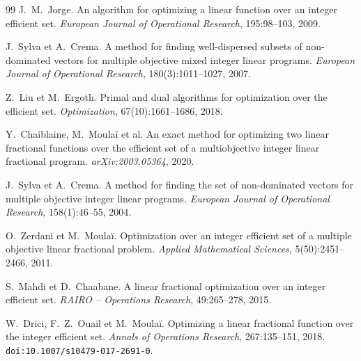 \documentclass[11pt,a4paper]{article}
\theoremstyle{plain}
\theoremstyle{remark}
\begin{document}
\begin{thebibliography}{99}
J.~M.~Jorge.
\newblock An algorithm for optimizing a linear function over an integer
  efficient set.
\newblock \emph{European Journal of Operational Research}, 195:98--103, 2009.

J.~Sylva et A.~Crema.
\newblock A method for finding well-dispersed subsets of non-dominated vectors
  for multiple objective mixed integer linear programs.
\newblock \emph{European Journal of Operational Research},
  180(3):1011--1027, 2007.

Z.~Liu et M.~Ergoth.
\newblock Primal and dual algorithms for optimization over the efficient set.
\newblock \emph{Optimization}, 67(10):1661--1686, 2018.

Y.~Chaiblaine, M.~Moulaï et al.
\newblock An exact method for optimizing two linear fractional functions over
  the efficient set of a multiobjective integer linear fractional program.
\newblock \emph{arXiv:2003.05364}, 2020.

J.~Sylva et A.~Crema.
\newblock A method for finding the set of non-dominated vectors for multiple
  objective integer linear programs.
\newblock \emph{European Journal of Operational Research},
  158(1):46--55, 2004.

O.~Zerdani et M.~Moulaï.
\newblock Optimization over an integer efficient set of a multiple objective
  linear fractional problem.
\newblock \emph{Applied Mathematical Sciences}, 5(50):2451--2466, 2011.

S.~Mahdi et D.~Chaabane.
\newblock A linear fractional optimization over an integer efficient set.
\newblock \emph{RAIRO -- Operations Research}, 49:265--278, 2015.

W.~Drici, F.~Z.~Ouail et M.~Moulaï.
\newblock Optimizing a linear fractional function over the integer efficient
  set.
\newblock \emph{Annals of Operations Research}, 267:135--151, 2018.
\newblock \texttt{doi:10.1007/s10479-017-2691-0}.

\end{thebibliography}
\end{document}
